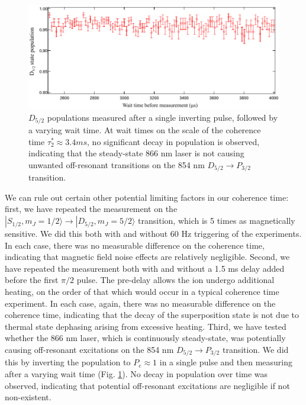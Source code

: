 \begin{figure}[ht]
    \begin{center}
        \includegraphics{figures/5/Fig_PopDecay}
        \caption{\label{fig:popflop} $D_{5/2}$ populations measured after a single inverting pulse, followed by a varying wait time. At wait times on the scale of the coherence time $\tau_2^* \approx 3.4 ms$, no significant decay in population is observed, indicating that the steady-state 866 nm laser is not causing unwanted off-resonant transitions on the 854 nm $D_{5/2} \rightarrow P_{3/2}$ transition.    }
    \end{center}
\end{figure}

We can rule out certain other potential limiting factors in our coherence time: first, we have repeated the measurement on the $|S_{1/2}, m_J = 1/2 \rangle \rightarrow |D_{5/2}, m_J = 5/2 \rangle$ transition, which is 5 times as magnetically sensitive. We did this both with and without 60 Hz triggering of the experiments. In each case, there was no measurable difference on the coherence time, indicating that magnetic field noise effects are relatively negligible. Second, we have repeated the measurement both with and without a 1.5 ms delay added before the first $\pi / 2$ pulse. The pre-delay allows the ion undergo additional heating, on the order of that which would occur in a typical coherence time experiment. In each case, again, there was no measurable difference on the coherence time, indicating that the decay of the superposition state is not due to thermal state dephasing arising from excessive heating. Third, we have tested whether the 866 nm laser, which is continuously steady-state, was potentially causing off-resonant excitations on the 854 nm $D_{5/2} \rightarrow P_{3/2}$ transition. We did this by inverting the population to $P_e \approx 1$ in a single pulse and then measuring after a varying wait time (Fig. \ref{fig:popflop}). No decay in population over time was observed, indicating that potential off-resonant excitations are negligible if not non-existent. 



